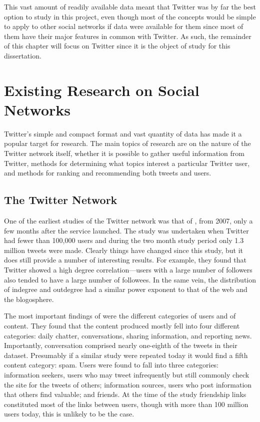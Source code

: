This vast amount of readily available data meant that Twitter was by far the best option to study in this project, even though most of the concepts would be simple to apply to other social networks if data were available for them since most of them have their major features in common with Twitter. As such, the remainder of this chapter will focus on Twitter since it is the object of study for this dissertation.


\section{Existing Research on Social Networks}

Twitter's simple and compact format and vast quantity of data has made it a popular target for research. The main topics of research are on the nature of the Twitter network itself, whether it is possible to gather useful information from Twitter, methods for determining what topics interest a particular Twitter user, and methods for ranking and recommending both tweets and users.

\subsection{The Twitter Network}

One of the earliest studies of the Twitter network was that of \cite{Java2007}, from 2007, only a few months after the service launched. The study was undertaken when Twitter had fewer than 100,000 users and during the two month study period only 1.3 million tweets were made. Clearly things have changed since this study, but it does still provide a number of interesting results. For example, they found that Twitter showed a high degree correlation---users with a large number of followers also tended to have a large number of followees. In the same vein, the distribution of indegree and outdegree had a similar power exponent to that of the web and the blogosphere.

The most important findings of \cite{Java2007} were the different categories of users and of content. They found that the content produced mostly fell into four different categories: daily chatter, conversations, sharing information, and reporting news. Importantly, conversation comprised nearly one-eighth of the tweets in their dataset. Presumably if a similar study were repeated today it would find a fifth content category: spam. Users were found to fall into three categories: information seekers, users who may tweet infrequently but still commonly check the site for the tweets of others; information sources, users who post information that others find valuable; and friends. At the time of the study friendship links constituted most of the links between users, though with more than 100 million users today, this is unlikely to be the case.

